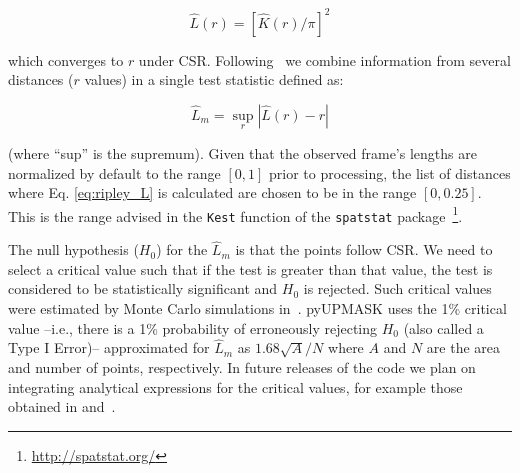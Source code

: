 \documentclass{aa}
\begin{document}
 \begin{equation}
 \hat{L}(r) = [\hat{K}(r)/\pi]^2
 \end{equation}

 \noindent which converges to $r$ under CSR. Following~\cite{Dixon_2014} we
 combine information from several distances ($r$ values) in a single test
 statistic defined as:

 \begin{equation}
 \hat{L}_{m} = \sup_{r} |\hat{L}(r) - r|
 \label{eq:ripley_L}
 \end{equation}

 \noindent (where ``sup'' is the supremum).
 Given that the observed frame's lengths are normalized by default to the
 range $[0,1]$ prior to processing, the list of distances where Eq.
 \ref{eq:ripley_L} is calculated are chosen to be in the range $[0, 0.25]$.
 This is the range advised in the \texttt{Kest} function of the
 \texttt{spatstat}
 package~\citep{Baddeley_2015}\footnote{\url{http://spatstat.org/}}.

 The null hypothesis ($H_0$) for the $\hat{L}_{m}$ is that the points follow
 CSR. We need to select a critical value such that if the test is
 greater than that value, the test is considered to be statistically
 significant and $H_0$ is rejected.
 Such critical values were estimated by Monte Carlo simulations
 in~\cite{ripley_1979}. pyUPMASK uses the 1\% critical value --i.e.,
 there is a 1\% probability of erroneously rejecting $H_0$ (also called a
 Type I Error)-- approximated for $\hat{L}_{m}$ as $1.68\sqrt{A}/N$ where
 $A$ and $N$ are the area and number of points, respectively.
 In future releases of the code we plan on integrating analytical
 expressions for the critical values, for example those obtained in
 \cite{Lagache_2013} and~\cite{Marcon_2013}.\\
\end{document}
